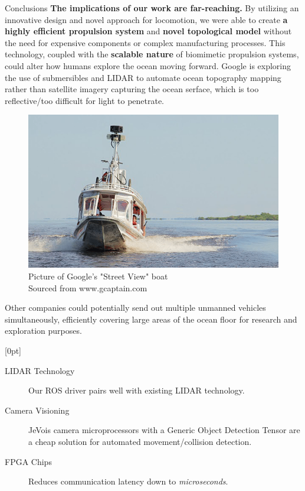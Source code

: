\documentclass[final, 16pt]{beamer}
\newlength{\colwidth}
\begin{document}
\begin{frame}[t]
\begin{columns}[t]
\begin{column}{\colwidth}
\begin{block}{Conclusions}
    \textbf{The implications of our work are far-reaching.} By utilizing an innovative design and novel approach for locomotion, we were able to create \textbf{a highly efficient propulsion system} and \textbf{novel topological model} without the need for expensive components or complex manufacturing processes. This technology, coupled with the \textbf{scalable nature} of biomimetic propulsion systems, could alter how humans explore the ocean moving forward. Google is exploring the use of submersibles and LIDAR to automate ocean topography mapping rather than satellite imagery capturing the ocean serface, which is too reflective/too difficult for light to penetrate.
    \begin{figure}
      \centering
      \vspace*{-0.5cm}
      \includegraphics[width=\linewidth, height=0.4\linewidth]{img/Street_View_Boat.png}
      \caption{Picture of Google's "Street View" boat \\ Sourced from www.gcaptain.com}
      \label{fig:street-view-boat}
    \end{figure} 
    Other companies could potentially send out multiple unmanned vehicles simultaneously, efficiently covering large areas of the ocean floor for research and exploration purposes.

    [0pt]

    \begin{description}
      \item[LIDAR Technology] Our ROS driver pairs well with existing LIDAR technology.
      \item[Camera Visioning] JeVois camera microprocessors with a Generic Object Detection Tensor are a cheap solution for automated movement/collision detection.
      \item[FPGA Chips] Reduces communication latency down to \emph{microseconds}.    
    \end{description}


\end{block}
\end{column}
\end{columns}
\end{frame}
\end{document}

